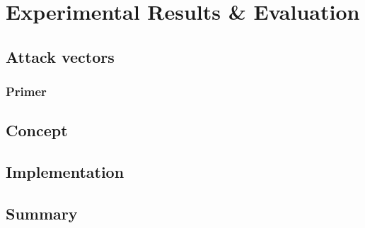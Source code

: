 \chapter{Experimental Results \& Evaluation}

\section{Attack vectors}

\subsection{Primer}

\section{Concept}

\section{Implementation}

\section{Summary}